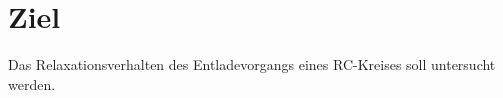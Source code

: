 \section{Ziel}
\label{sec:Ziel}

Das Relaxationsverhalten des Entladevorgangs eines RC-Kreises soll untersucht werden.